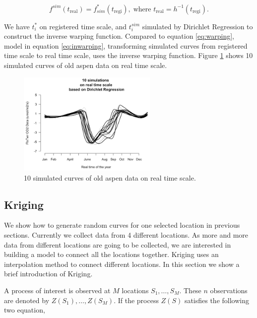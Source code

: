 \documentclass{article}\usepackage[]{graphicx}\usepackage[]{color}
\begin{document}
\begin{equation}\label{eq:inwarping}
f^{sim}(t_{\textrm{real}}) = f^{*}_{sim}(t_{\textrm{regi}}),\;\textrm{where } t_\textrm{real}=h^{-1}(t_{\textrm{regi}}).
\end{equation}

We have $t_i^{*}$ on registered time scale, and $t_i^{sim}$ simulated by Dirichlet Regression to construct the inverse warping function.
Compared to equation \ref{eq:warping}, model in equation \ref{eq:inwarping}, transforming simulated curves from registered time scale to real time scale, uses the inverse warping function. 
Figure \ref{Fig:RealSimu} shows 10 simulated curves of old aspen data on real time scale.


\begin{figure}[!ht]
\centering
\includegraphics[width=0.6\textwidth]{RealSimu.png}
\caption{10 simulated curves of old aspen data on real time scale.}\label{Fig:RealSimu}
\end{figure}



\subsection{Kriging}\label{SubSec:Kriging}

We show how to generate random curves for one selected location in previous sections.  Currently we collect data from 4 different locations. As more and more data from different locations are going to be collected, we are interested in building a model to connect all the locations together. Kriging uses an interpolation method to connect different locations. In this section we show a brief introduction of Kriging. 

A process of interest is observed at $M$ locations $S_1,\dots,S_M$. These $n$ observations are denoted by $Z(S_1),\dots,Z(S_M)$. If the process $Z(S)$ satisfies the following two equation,
\end{document}

